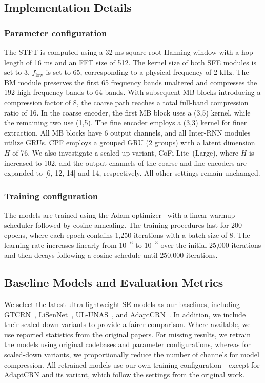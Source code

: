 \documentclass[journal]{IEEEtran}
\begin{document}
\subsection{Implementation Details}
\subsubsection{Parameter configuration}
The STFT is computed using a 32 ms square-root Hanning window with a hop length of 16 ms and an FFT size of 512.
The kernel size of both SFE modules is set to 3.
$f_{\text{low}}$ is set to 65, corresponding to a physical frequency of 2 kHz.
The BM module preserves the first 65 frequency bands unaltered and compresses the 192 high-frequency bands to 64 bands.
With subsequent MB blocks introducing a compression factor of 8, the coarse path reaches a total full-band compression ratio of 16.
In the coarse encoder, the first MB block uses a (3,5) kernel, while the remaining two use (1,5).
The fine encoder employs a (3,3) kernel for finer extraction.
All MB blocks have 6 output channels, and all Inter-RNN modules utilize GRUs.
CPF employs a grouped GRU (2 groups) with a latent dimension $H$ of 76.
We also investigate a scaled-up variant, CoFi-Lite~(Large), where $H$ is increased to 102, and the output channels of the coarse and fine encoders are expanded to [6, 12, 14] and 14, respectively.
All other settings remain unchanged.

\subsubsection{Training configuration}
The models are trained using the Adam optimizer~\cite{adam} with a linear warmup scheduler followed by cosine annealing.
The training procedures last for 200 epochs, where each epoch contains 1,250 iterations with a batch size of 8.
The learning rate increases linearly from $10^{-6}$ to $10^{-3}$ over the initial 25,000 iterations and then decays following a cosine schedule until 250,000 iterations.  

\vspace{-0.3em}

\subsection{Baseline Models and Evaluation Metrics}
We select the latest ultra-lightweight SE models as our baselines, including GTCRN~\cite{gtcrn}, LiSenNet~\cite{lisennet}, UL-UNAS~\cite{ulunas}, and AdaptCRN~\cite{adaptivecrn}.
In addition, we include their scaled-down variants to provide a fairer comparison.
Where available, we use reported statistics from the original papers.
For missing results, we retrain the models using original codebases and parameter configurations, whereas for scaled-down variants, we proportionally reduce the number of channels for model compression. 
All retrained models use our own training configuration—except for AdaptCRN and its variant, which follow the settings from the original work.
\end{document}
